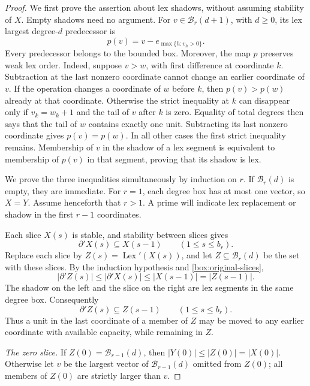 \begin{proof}
We first prove the assertion about lex shadows, without assuming
stability of \(X\).  Empty shadows need no argument.  For
\(v\in\mathcal B_r(d+1)\), with \(d\ge0\), its lex largest
degree-\(d\) predecessor is
\[
 p(v)=v-e_{\max\{h:v_h>0\}}.
\]
Every predecessor belongs to the bounded box.  Moreover, the map
\(p\) preserves weak lex order.  Indeed, suppose \(v>w\), with first
difference at coordinate \(k\).  Subtraction at the last nonzero
coordinate cannot change an earlier coordinate of \(v\).  If the
operation changes a coordinate of \(w\) before \(k\), then
\(p(v)>p(w)\) already at that coordinate.  Otherwise the strict
inequality at \(k\) can disappear only if \(v_k=w_k+1\) and the tail
of \(v\) after \(k\) is zero.  Equality of total degrees then says
that the tail of \(w\) contains exactly one unit.  Subtracting its
last nonzero coordinate gives \(p(v)=p(w)\).  In all other cases the
first strict inequality remains.  Membership of \(v\) in the shadow
of a lex segment is equivalent to membership of \(p(v)\) in that
segment, proving that its shadow is lex.

We prove the three inequalities simultaneously by induction on
\(r\).  If \(\mathcal B_r(d)\) is empty, they are immediate.  For
\(r=1\), each degree box has at most one vector, so \(X=Y\).
Assume henceforth that \(r>1\).  A prime will indicate lex
replacement or shadow in the first \(r-1\) coordinates.

Each slice \(X(s)\) is stable, and stability between slices gives
\begin{equation}
 \label{box:original-slices}
 \partial'X(s)\subseteq X(s-1)
       \qquad(1\le s\le b_r).
\end{equation}
Replace each slice by \(Z(s)=\operatorname{Lex}'(X(s))\), and let
\(Z\subseteq\mathcal B_r(d)\) be the set with these slices.
By the induction hypothesis and \eqref{box:original-slices},
\[
 |\partial'Z(s)|\le|\partial'X(s)|\le|X(s-1)|=|Z(s-1)|.
\]
The shadow on the left and the slice on the right are lex segments
in the same degree box.  Consequently
\begin{equation}
 \label{box:compressed-slices}
 \partial'Z(s)\subseteq Z(s-1)
       \qquad(1\le s\le b_r).
\end{equation}
Thus a unit in the last coordinate of a member of \(Z\) may be moved
to any earlier coordinate with available capacity, while remaining
in \(Z\).

\smallskip\noindent
\emph{The zero slice.}
If \(Z(0)=\mathcal B_{r-1}(d)\), then
\(|Y(0)|\le|Z(0)|=|X(0)|\).  Otherwise let \(v\) be the largest
vector of \(\mathcal B_{r-1}(d)\) omitted from \(Z(0)\); all members
of \(Z(0)\) are strictly larger than \(v\).


\end{proof}
